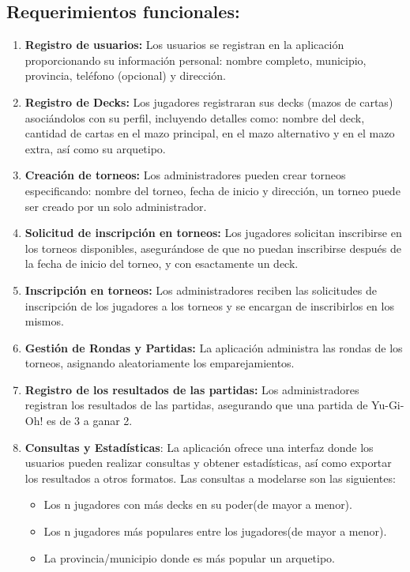 \documentclass[a4paper]{article}
\begin{document}
\subsection{Requerimientos funcionales:}
\begin{enumerate}
	\item \textbf{Registro de usuarios:} Los usuarios se registran en la aplicación proporcionando su información personal: nombre completo, municipio, provincia, teléfono (opcional) y dirección.
	\item \textbf{Registro de Decks:} Los jugadores registraran sus decks (mazos de cartas) asoci\'andolos con su perfil, incluyendo detalles como: nombre del deck, cantidad de cartas en el mazo principal, en el mazo alternativo y en el mazo extra, así como su arquetipo.
	\item \textbf{Creaci\'on de torneos:} Los administradores pueden crear torneos especificando: nombre del torneo, fecha de inicio y dirección, un torneo puede ser creado por un solo administrador.
	\item \textbf{Solicitud de inscripci\'on en torneos:} Los jugadores solicitan inscribirse en los torneos disponibles, asegur\'andose de que no puedan inscribirse despu\'es de la fecha de inicio del torneo, y con esactamente un deck. 
	\item \textbf{Inscripci\'on en torneos:} Los administradores reciben las solicitudes de inscripci\'on de los jugadores a los torneos y se encargan de inscribirlos en los mismos.
    \item \textbf{Gestión de Rondas y Partidas:} La aplicaci\'on administra las rondas de los torneos, asignando aleatoriamente los emparejamientos.
    \item \textbf{Registro de los resultados de las partidas:} Los administradores registran los resultados de las partidas, asegurando que una partida de Yu-Gi-Oh! es de 3 a ganar 2.
    \item \textbf{Consultas y Estad\'isticas}: La aplicaci\'on ofrece una interfaz donde los usuarios pueden realizar consultas y obtener estad\'isticas, as\'i como exportar los resultados a otros formatos. Las consultas a modelarse son las siguientes:
    \begin{itemize}
    \item Los n jugadores con m\'as decks en su poder(de mayor a menor).
    \item Los n jugadores m\'as populares entre los jugadores(de mayor a menor).
    \item La provincia/municipio donde es m\'as popular un arquetipo.

\end{itemize}
\end{enumerate}
\end{document}
